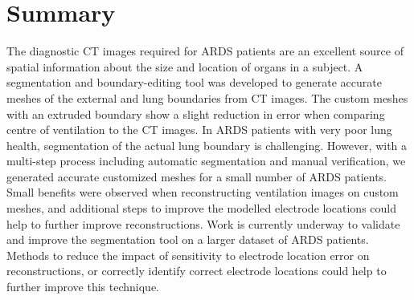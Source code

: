 \section{Summary}

The diagnostic CT images required for ARDS patients are an excellent source of spatial 
information about the size and location of organs in a subject. 
A segmentation and 
boundary-editing tool
was developed to generate accurate meshes of the external and lung
boundaries from CT images. 
The custom meshes with an extruded boundary show a slight reduction in error 
when comparing centre of ventilation to the CT images.
In ARDS patients with very poor lung health, segmentation of the actual lung boundary is 
challenging. However, with a multi-step process including automatic segmentation and 
manual verification, we generated accurate customized meshes for 
a small number of ARDS patients. 
Small benefits were observed when reconstructing ventilation images 
on custom meshes, and additional steps to improve the modelled electrode 
locations could help to further improve reconstructions. 
Work is currently underway to validate and improve the segmentation tool on 
a larger dataset of ARDS patients. 
Methods to reduce the impact of sensitivity to electrode 
location error on reconstructions, or correctly identify 
correct electrode locations could help to further improve this technique. 

